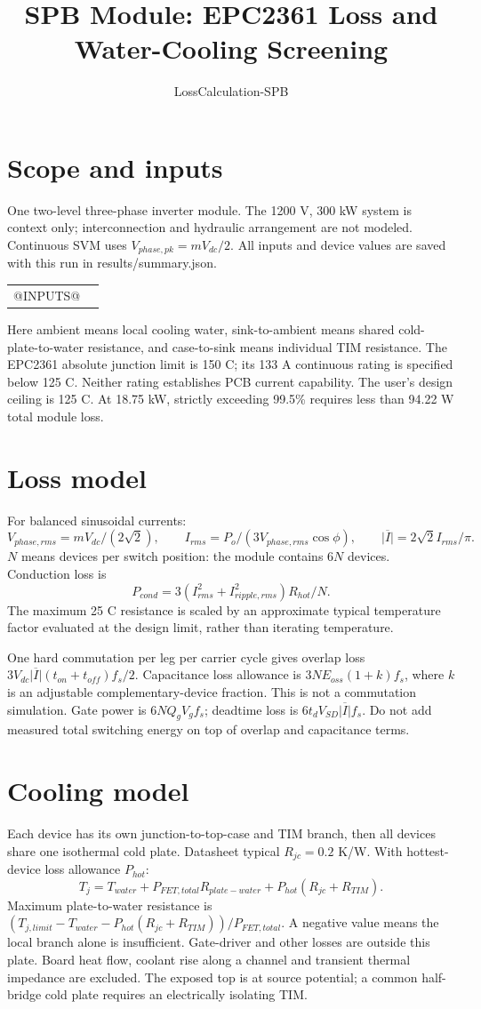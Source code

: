 \documentclass[a4paper,10pt]{article}
\title{SPB Module: EPC2361 Loss and Water-Cooling Screening}
\author{LossCalculation-SPB}
\begin{document}
\maketitle

\section{Scope and inputs}
One two-level three-phase inverter module. The 1200 V, 300 kW system is
context only; interconnection and hydraulic arrangement are not modeled.
Continuous SVM uses $V_{phase,pk}=mV_{dc}/2$. All inputs and device values
are saved with this run in results/summary.json.
\begin{center}\begin{tabular}{lr}
@INPUTS@
\end{tabular}\end{center}
Here ambient means local cooling water, sink-to-ambient means shared
cold-plate-to-water resistance, and case-to-sink means individual TIM resistance.
The EPC2361 absolute junction limit is 150 C; its 133 A continuous rating
is specified below 125 C. Neither rating establishes PCB current capability.
The user's design ceiling is 125 C. At 18.75 kW, strictly exceeding 99.5\%
requires less than 94.22 W total module loss.
\section{Loss model}
For balanced sinusoidal currents:
\[V_{phase,rms}=mV_{dc}/(2\sqrt{2}),\qquad
I_{rms}=P_o/(3V_{phase,rms}\cos\phi),\qquad
\overline{|I|}=2\sqrt{2}I_{rms}/\pi.\]
$N$ means devices per switch position: the module contains $6N$ devices.
Conduction loss is
\[P_{cond}=3(I_{rms}^2+I_{ripple,rms}^2)R_{hot}/N.\]
The maximum 25 C resistance is scaled by an approximate typical temperature
factor evaluated at the design limit, rather than iterating temperature.

One hard commutation per leg per carrier cycle gives overlap loss
$3V_{dc}\overline{|I|}(t_{on}+t_{off})f_s/2$.
Capacitance loss allowance is $3NE_{oss}(1+k)f_s$, where $k$ is an adjustable
complementary-device fraction. This is not a commutation simulation.
Gate power is $6NQ_gV_gf_s$; deadtime loss is $6t_dV_{SD}\overline{|I|}f_s$.
Do not add measured total switching energy on top of overlap and capacitance terms.
\section{Cooling model}
Each device has its own junction-to-top-case and TIM branch, then all devices
share one isothermal cold plate. Datasheet typical $R_{jc}=0.2$ K/W.
With hottest-device loss allowance $P_{hot}$:
\[
T_j=T_{water}+P_{FET,total}R_{plate-water}+P_{hot}(R_{jc}+R_{TIM}).
\]
Maximum plate-to-water resistance is
$(T_{j,limit}-T_{water}-P_{hot}(R_{jc}+R_{TIM}))/P_{FET,total}$.
A negative value means the local branch alone is insufficient.
Gate-driver and other losses are outside this plate. Board heat flow, coolant
rise along a channel and transient thermal impedance are excluded.
The exposed top is at source potential; a common half-bridge cold plate
requires an electrically isolating TIM.
\end{document}
